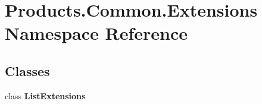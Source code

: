 \hypertarget{namespace_products_1_1_common_1_1_extensions}{}\section{Products.\+Common.\+Extensions Namespace Reference}
\label{namespace_products_1_1_common_1_1_extensions}
\subsection*{Classes}
\begin{DoxyCompactItemize}
\item 
class {\bfseries List\+Extensions}
\end{DoxyCompactItemize}
